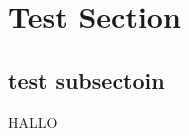 \documentclass{article}%
\begin{document}
%
\normalsize%
\section{Test Section}%
\label{sec:TestSection}%
\subsection{test subsectoin}%
\label{subsec:testsubsectoin}%
HALLO

%
\end{document}
